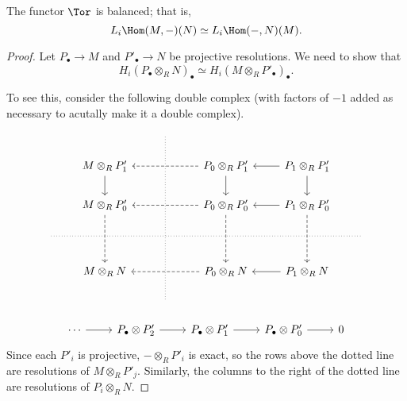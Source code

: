 \documentclass[main.tex]{subfiles}
\begin{document}
\begin{proposition}
  \label{prop:tor_balanced}
  The functor $\Tor$ is balanced; that is,
  \begin{equation*}
    L_{i} \Hom(M, -)(N) \simeq L_{i} \Hom(-, N)(M).
  \end{equation*}
\end{proposition}
\begin{proof}
  Let $P_{\bullet} \to M$ and $P'_{\bullet} \to N$ be projective resolutions. We need to show that
  \begin{equation*}
    H_{i}(P_{\bullet} \otimes_{R} N)_{\bullet} \simeq H_{i}(M \otimes_{R} P'_{\bullet})_{\bullet}.
  \end{equation*}

  To see this, consider the following double complex (with factors of $-1$ added as necessary to acutally make it a double complex).
  \begin{equation*}
    \begin{tikzcd}
      && \
      \arrow[ddddd, no head, dotted]
      \\
      & M \otimes_{R} P'_{1}
      \arrow[d]
      && P_{0} \otimes_{R} P'_{1}
      \arrow[ll, dashed]
      \arrow[d]
      & P_{1} \otimes_{R} P'_{1}
      \arrow[l]
      \arrow[d]
      \\
      & M \otimes_{R} P'_{0}
      \arrow[dd, dashed]
      && P_{0} \otimes_{R} P'_{0}
      \arrow[ll, dashed]
      \arrow[dd, dashed]
      & P_{1} \otimes_{R} P'_{0}
      \arrow[l]
      \arrow[dd, dashed]
      \\
      \
      \arrow[rrrrr, dotted, no head]
      &&&&& \
      \\
      & M \otimes_{R} N
      && P_{0} \otimes_{R} N
      \arrow[ll, dashed]
      & P_{1} \otimes_{R} N
      \arrow[l]
      \\
      && \
    \end{tikzcd}
  \end{equation*}

  \begin{equation*}
    \begin{tikzcd}
      \cdots
      \arrow[r]
      & P_{\bullet} \otimes P'_{2}
      \arrow[r]
      & P_{\bullet} \otimes P'_{1}
      \arrow[r]
      & P_{\bullet} \otimes P'_{0}
      \arrow[r]
      & 0
    \end{tikzcd}
  \end{equation*}
  Since each $P'_{i}$ is projective, $- \otimes_{R} P'_{i}$ is exact, so the rows above the dotted line are resolutions of $M \otimes_{R} P'_{j}$. Similarly, the columns to the right of the dotted line are resolutions of $P_{i} \otimes_{R} N$.


\end{proof}
\end{document}
